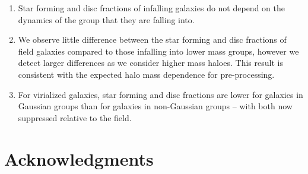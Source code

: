 \documentclass[a4paper,fleqn,usenatbib]{mnras}
\begin{document}
\begin{enumerate}
  \item Star forming and disc fractions of infalling galaxies do not
    depend on the dynamics of the group that they are falling into.

  \item We observe little difference between the star forming
    and disc fractions of field galaxies compared to those infalling
    into lower mass groups, however we detect larger differences as we
    consider higher mass haloes.  This result is
    consistent with the expected halo mass dependence for pre-processing.

  \item For virialized galaxies, star forming and disc fractions are
    lower for galaxies in Gaussian groups than for galaxies in
    non-Gaussian groups -- with both now suppressed relative to the field.
\end{enumerate}


\section*{Acknowledgments}
\label{sec:acknowledgments}
\end{document}
